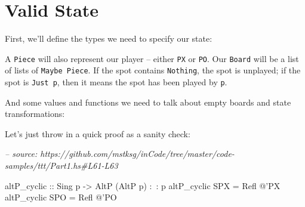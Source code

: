 \documentclass[]{article}
\newenvironment{Shaded}{}{}
\newcommand{\CommentTok}[1]{\textcolor[rgb]{0.38,0.63,0.69}{\textit{#1}}}
\newcommand{\DataTypeTok}[1]{\textcolor[rgb]{0.56,0.13,0.00}{#1}}
\newcommand{\FunctionTok}[1]{\textcolor[rgb]{0.02,0.16,0.49}{#1}}
\newcommand{\NormalTok}[1]{#1}
\newcommand{\OtherTok}[1]{\textcolor[rgb]{0.00,0.44,0.13}{#1}}
\begin{document}
\hypertarget{valid-state}{%
\section{Valid State}\label{valid-state}}

First, we'll define the types we need to specify our state:

\begin{Shaded}
\end{Shaded}

A \texttt{Piece} will also represent our player -- either \texttt{PX} or
\texttt{PO}. Our \texttt{Board} will be a list of lists of
\texttt{Maybe\ Piece}. If the spot contains \texttt{Nothing}, the spot is
unplayed; if the spot is \texttt{Just\ p}, then it means the spot has been
played by \texttt{p}.

And some values and functions we need to talk about empty boards and state
transformations:

\begin{Shaded}
\end{Shaded}

Let's just throw in a quick proof as a sanity check:

\begin{Shaded}
\begin{Highlighting}[]
\CommentTok{-- source: https://github.com/mstksg/inCode/tree/master/code-samples/ttt/Part1.hs#L61-L63}

\OtherTok{altP_cyclic ::} \DataTypeTok{Sing}\NormalTok{ p }\OtherTok{->} \DataTypeTok{AltP}\NormalTok{ (}\DataTypeTok{AltP}\NormalTok{ p) }\FunctionTok{:~:}\NormalTok{ p}
\NormalTok{altP_cyclic }\DataTypeTok{SPX} \FunctionTok{=} \DataTypeTok{Refl} \FunctionTok{@}\NormalTok{'}\DataTypeTok{PX}
\NormalTok{altP_cyclic }\DataTypeTok{SPO} \FunctionTok{=} \DataTypeTok{Refl} \FunctionTok{@}\NormalTok{'}\DataTypeTok{PO}
\end{Highlighting}
\end{Shaded}
\end{document}
